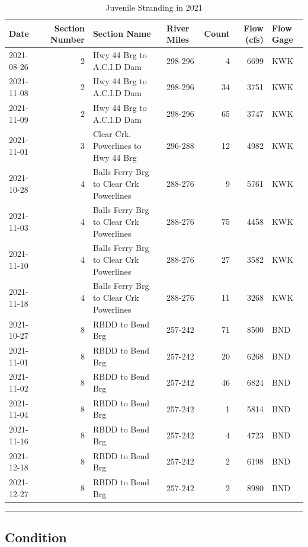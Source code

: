 \documentclass[
]{book}
\theoremstyle{definition}
\theoremstyle{definition}
\theoremstyle{definition}
\theoremstyle{definition}
\theoremstyle{remark}
\begin{document}
\begin{table}
\centering
\caption{Juvenile Stranding in 2021}
\centering
\begin{tabular}[t]{lrllrrl}
\hline
Date & Section Number & Section Name & River Miles & Count & Flow (cfs) & Flow Gage\\
\hline
2021-08-26 & 2 & Hwy 44 Brg to A.C.I.D Dam & 298-296 & 4 & 6699 & KWK\\
\hline
2021-11-08 & 2 & Hwy 44 Brg to A.C.I.D Dam & 298-296 & 34 & 3751 & KWK\\
\hline
2021-11-09 & 2 & Hwy 44 Brg to A.C.I.D Dam & 298-296 & 65 & 3747 & KWK\\
\hline
2021-11-01 & 3 & Clear Crk. Powerlines to Hwy 44 Brg & 296-288 & 12 & 4982 & KWK\\
\hline
2021-10-28 & 4 & Balls Ferry Brg to Clear Crk Powerlines & 288-276 & 9 & 5761 & KWK\\
\hline
2021-11-03 & 4 & Balls Ferry Brg to Clear Crk Powerlines & 288-276 & 75 & 4458 & KWK\\
\hline
2021-11-10 & 4 & Balls Ferry Brg to Clear Crk Powerlines & 288-276 & 27 & 3582 & KWK\\
\hline
2021-11-18 & 4 & Balls Ferry Brg to Clear Crk Powerlines & 288-276 & 11 & 3268 & KWK\\
\hline
2021-10-27 & 8 & RBDD to Bend Brg & 257-242 & 71 & 8500 & BND\\
\hline
2021-11-01 & 8 & RBDD to Bend Brg & 257-242 & 20 & 6268 & BND\\
\hline
2021-11-02 & 8 & RBDD to Bend Brg & 257-242 & 46 & 6824 & BND\\
\hline
2021-11-04 & 8 & RBDD to Bend Brg & 257-242 & 1 & 5814 & BND\\
\hline
2021-11-16 & 8 & RBDD to Bend Brg & 257-242 & 4 & 4723 & BND\\
\hline
2021-12-18 & 8 & RBDD to Bend Brg & 257-242 & 2 & 6198 & BND\\
\hline
2021-12-27 & 8 & RBDD to Bend Brg & 257-242 & 2 & 8980 & BND\\
\hline
\end{tabular}
\end{table}

\begin{center}\rule{0.5\linewidth}{0.5pt}\end{center}

\hypertarget{condition}{%
\subsection{Condition}\label{condition}}
\end{document}
